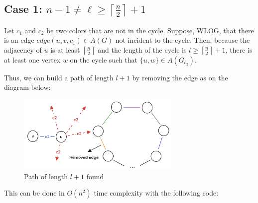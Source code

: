 \subsection{Case 1: \( n - 1 \neq \ell \geq \left \lceil \frac{n}{2} \right \rceil + 1 \)}

Let $c_1$ and $c_2$ be two colors that are not in the cycle. Suppose, WLOG, that 
there is an edge $edge(u, v, c_1) \in A(G)$ not incident to the cycle. Then, because
the adjacency of $u$ is at least $\left \lceil \frac{n}{2} \right \rceil$ and the 
length of the cycle is $l \geq \left \lceil \frac{n}{2} \right \rceil + 1$, there is at least
one vertex $w$ on the cycle such that $\{u, w\} \in A(G_{c_2})$.

Thus, we can build a path of length $l + 1$ by removing the edge as on the diagram below:

\begin{figure}[H]
    \centering
    \includegraphics[width=0.7\textwidth]{figuras/cycle_path_extension.png}
    \caption{Path of length \( l + 1 \) found}
    \label{fig:cycle_path_extension}
\end{figure}

This can be done in $O(n^2)$ time complexity with the following code:

